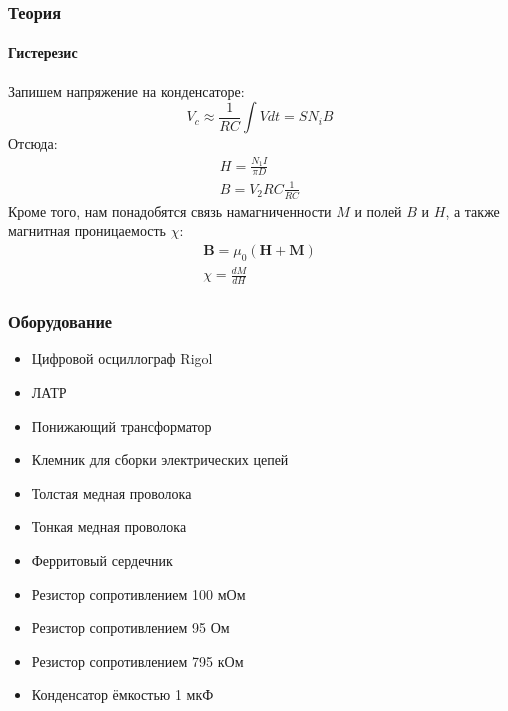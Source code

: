 \documentclass[8pt,pdf,hyperref={unicode}]{beamer}
\begin{document}
\begin{frame}
	\frametitle{Теория}
	\framesubtitle{Гистерезис} 
	\begin{center}
		Запишем напряжение на конденсаторе:
		\begin{equation}
			V_c \approx \frac{1}{RC}\int V dt = S N_i B
		\end{equation}	
		Отсюда:
		\begin{equation}
			\begin{gathered}
			H = \frac{N_1 I}{\pi D} \\
			B = V_2 R C \frac{1}{R C}
			\end{gathered}
		\end{equation}
		Кроме того, нам понадобятся связь намагниченности $M$ и полей $B$ и $H$, а также магнитная проницаемость $\chi$:
		\begin{equation}
		\begin{gathered}
		\mathbf{B} =\mu_0(\mathbf{H} + \textbf{M})\\
		\chi = \frac{dM}{dH}
		\end{gathered}
		\end{equation}
	\end{center}
\end{frame}

	\begin{frame}
		\frametitle{Оборудование} 
		\begin{center}
			\begin{itemize}
				\item Цифровой осциллограф Rigol
				\item ЛАТР
				\item Понижающий трансформатор
				\item Клемник для сборки электрических цепей
				\item Толстая медная проволока
				\item Тонкая медная проволока
				\item Ферритовый сердечник
				\item Резистор сопротивлением 100 мОм
				\item Резистор сопротивлением 95 Ом
				\item Резистор сопротивлением 795 кОм
				\item Конденсатор ёмкостью 1 мкФ
			\end{itemize}
		\end{center}
	\end{frame}
\end{document}
